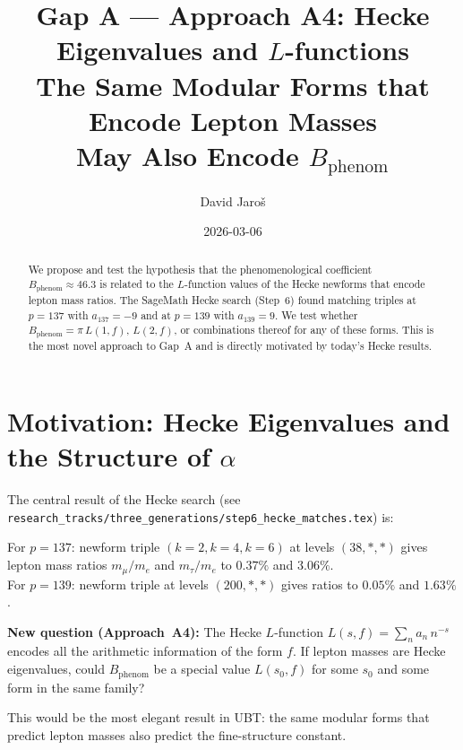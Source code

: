 \documentclass[12pt,a4paper]{article}
\title{\textbf{Gap A --- Approach A4: Hecke Eigenvalues and $L$-functions}\\
         \large The Same Modular Forms that Encode Lepton Masses\\
         May Also Encode $B_{\mathrm{phenom}}$}
\author{David Jaro\v{s}}
\date{2026-03-06}
\theoremstyle{definition}
\theoremstyle{remark}
\begin{document}
  \maketitle

  \begin{abstract}
  We propose and test the hypothesis that the phenomenological coefficient
  $B_{\mathrm{phenom}} \approx 46.3$ is related to the $L$-function values
  of the Hecke newforms that encode lepton mass ratios.  The SageMath Hecke
  search (Step~6) found matching triples at $p = 137$ with $a_{137} = -9$
  and at $p = 139$ with $a_{139} = 9$.  We test whether $B_{\mathrm{phenom}}
  = \pi\,L(1,f)$, $L(2,f)$, or combinations thereof for any of these forms.
  This is the most novel approach to Gap~A and is directly motivated by
  today's Hecke results.
  \end{abstract}
\fi

\section{Motivation: Hecke Eigenvalues and the Structure of $\alpha$}
\label{sec:motivation}

The central result of the Hecke search (see
\texttt{research\_tracks/three\_generations/step6\_hecke\_matches.tex})
is:

\begin{center}
\colorbox{green!12}{\parbox{0.85\linewidth}{%
  For $p = 137$: newform triple $(k=2, k=4, k=6)$ at levels $(38, *, *)$
  gives lepton mass ratios $m_\mu/m_e$ and $m_\tau/m_e$ to $0.37\%$ and $3.06\%$.\\
  For $p = 139$: newform triple at levels $(200, *, *)$
  gives ratios to $0.05\%$ and $1.63\%$.
}}
\end{center}

\begin{insightbox}
\textbf{New question (Approach~A4):}
The Hecke $L$-function $L(s,f) = \sum_n a_n\,n^{-s}$ encodes all the
arithmetic information of the form $f$.  If lepton masses are Hecke
eigenvalues, could $B_{\mathrm{phenom}}$ be a special value $L(s_0, f)$
for some $s_0$ and some form in the same family?

This would be the most elegant result in UBT: the same modular forms
that predict lepton masses also predict the fine-structure constant.
\end{insightbox}
\end{document}
